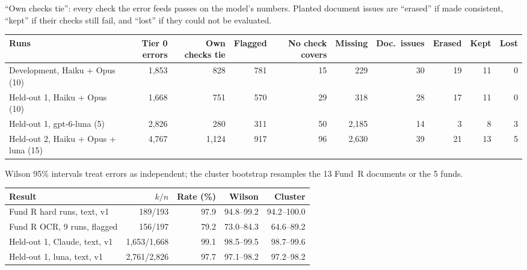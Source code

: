 \label{tab:bend} ``Own checks tie'': every check the error feeds passes on the model's numbers. Planted document issues are ``erased'' if made consistent, ``kept'' if their checks still fail, and ``lost'' if they could not be evaluated.
\begin{center}\footnotesize\setlength{\tabcolsep}{3pt}
\begin{tabular}{lrrrrrrrrr}
\toprule
Runs & Tier 0 errors & Own checks tie & Flagged & No check covers & Missing & Doc.\ issues & Erased & Kept & Lost \\
\midrule
Development, Haiku + Opus (10) & 1,853 & 828 & 781 & 15 & 229 & 30 & 19 & 11 & 0 \\
Held-out 1, Haiku + Opus (10) & 1,668 & 751 & 570 & 29 & 318 & 28 & 17 & 11 & 0 \\
Held-out 1, gpt-6-luna (5) & 2,826 & 280 & 311 & 50 & 2,185 & 14 & 3 & 8 & 3 \\
Held-out 2, Haiku + Opus + luna (15) & 4,767 & 1,124 & 917 & 96 & 2,630 & 39 & 21 & 13 & 5 \\
\bottomrule
\end{tabular}
\end{center}

\label{tab:ci} Wilson 95\% intervals treat errors as independent; the cluster bootstrap resamples the 13 Fund~R documents or the 5 funds.
\begin{center}
\begin{tabular}{lrrrr}
\toprule
Result & $k/n$ & Rate (\%) & Wilson & Cluster \\
\midrule
Fund R hard runs, text, v1 & 189/193 & 97.9 & 94.8--99.2 & 94.2--100.0 \\
Fund R OCR, 9 runs, flagged & 156/197 & 79.2 & 73.0--84.3 & 64.6--89.2 \\
Held-out 1, Claude, text, v1 & 1,653/1,668 & 99.1 & 98.5--99.5 & 98.7--99.6 \\
Held-out 1, luna, text, v1 & 2,761/2,826 & 97.7 & 97.1--98.2 & 97.2--98.2 \\
\bottomrule
\end{tabular}
\end{center}

